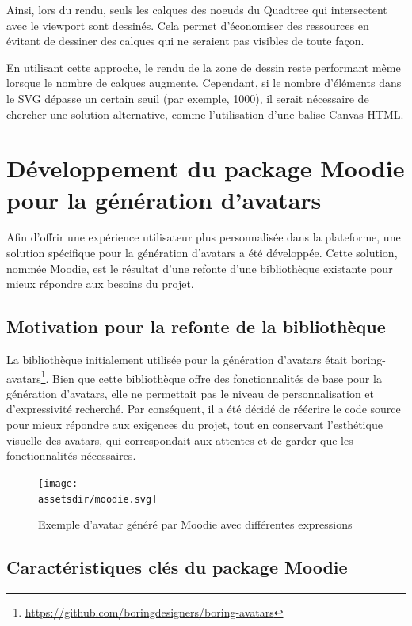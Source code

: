 Ainsi, lors du rendu, seuls les calques des noeuds du Quadtree qui intersectent avec le viewport sont dessinés. Cela permet d'économiser des ressources en évitant de dessiner des calques qui ne seraient pas visibles de toute façon.

En utilisant cette approche, le rendu de la zone de dessin reste performant même lorsque le nombre de calques augmente. Cependant, si le nombre d'éléments dans le SVG dépasse un certain seuil (par exemple, 1000), il serait nécessaire de chercher une solution alternative, comme l'utilisation d'une balise Canvas HTML.

\section{Développement du package Moodie pour la génération d'avatars\label{moodie}}

Afin d'offrir une expérience utilisateur plus personnalisée dans la plateforme, une solution spécifique pour la génération d'avatars a été développée. Cette solution, nommée Moodie, est le résultat d'une refonte d'une bibliothèque existante pour mieux répondre aux besoins du projet.

\subsection{Motivation pour la refonte de la bibliothèque}

La bibliothèque initialement utilisée pour la génération d'avatars était boring-avatars\footnote{\url{https://github.com/boringdesigners/boring-avatars}}. Bien que cette bibliothèque offre des fonctionnalités de base pour la génération d'avatars, elle ne permettait pas le niveau de personnalisation et d'expressivité recherché. Par conséquent, il a été décidé de réécrire le code source pour mieux répondre aux exigences du projet, tout en conservant l'esthétique visuelle des avatars, qui correspondait aux attentes et de garder que les fonctionnalités nécessaires.

\begin{figure}[H]
    \centering
    \texttt{[image: \\assetsdir/moodie.svg]}
    \caption{Exemple d'avatar généré par Moodie avec différentes expressions}
\end{figure}

\subsection{Caractéristiques clés du package Moodie}

